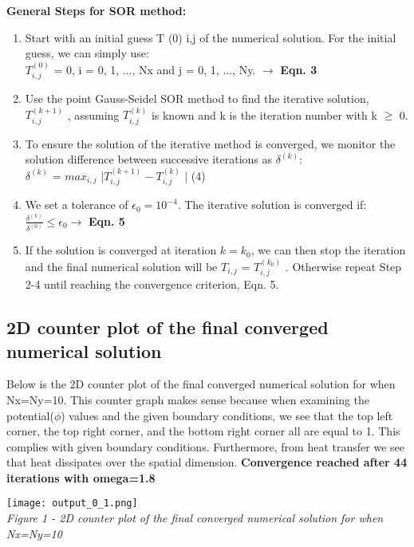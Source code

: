 \documentclass[a4paper, twoside]{article}
\begin{document}
\textbf{General Steps for SOR method:}
\begin{center}
\begin{enumerate}
    \item Start with an initial guess T (0) i,j of the numerical solution. For the initial guess, we can simply use: \\

     $T^{(0)}_{i,j}$ = 0, i = 0, 1, ..., Nx and j = 0, 1, ..., Ny. $\rightarrow$ \textbf{Eqn. 3}
    \item Use the point Gauss-Seidel SOR method to find the iterative solution, $T^{(k+1)}_{i,j}$ , assuming $T^{(k)}_{i,j}$ is known and k is the iteration number with k $\geq$ 0.
    \item To ensure the solution of the iterative method is converged, we monitor the solution
    difference between successive iterations as $\delta^{(k)}$: \\
    $\delta^{(k)}$ = $max_{i,j}$ |$T^{(k+1)}_{i,j} - T^{(k)}_{i,j}$ | (4)
    \item We set a tolerance of $\epsilon_0=10^{-4}$. The iterative solution is converged if: \\
    $\frac{\delta^{(k)}}{\delta^{(0)}} \leq \epsilon_0 \rightarrow$ \textbf{Eqn. 5}
    \item If the solution is converged at iteration $k = k_0$, we can then stop the iteration and the
    final numerical solution will be $T_{i,j}$ = $T^{(k_0)}_{i,j}$ . Otherwise repeat Step 2-4 until reaching the convergence criterion, Eqn. 5.
\end{enumerate}
\end{center}
\subsection{2D counter plot of the final converged numerical solution}
Below is the 2D counter plot of the final converged numerical solution for when Nx=Ny=10. This counter graph makes sense because when examining the potential($\phi$) values and the given boundary conditions, we see that the top left corner, the top right corner, and the bottom right corner all are equal to 1. This complies with given boundary conditions. Furthermore, from heat transfer we see that heat dissipates over the spatial dimension. \textbf{Convergence reached after 44 iterations with omega=1.8}  \\
\begin{center}
    \texttt{[image: output\_0\_1.png]} \\
    \textit{Figure 1 - 2D counter plot of the final converged numerical solution for when Nx=Ny=10}
\end{center}
\end{document}
